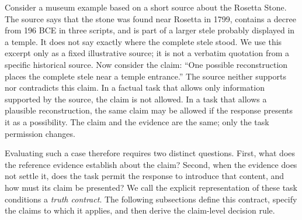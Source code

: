 \documentclass{clv2025}
\begin{document}
 Consider a museum example based on a short source about the Rosetta Stone. 
 The source says that the stone was found near Rosetta in 1799, 
 contains a decree from 196 BCE in three scripts, and is part of a larger stele probably displayed in a temple. 
 It does not say exactly where the complete stele stood. 
 We use this excerpt only as a fixed illustrative source; it is not a verbatim quotation from a specific historical source.
Now consider the claim: ``One possible reconstruction places the complete stele near a temple entrance.'' 
The source neither supports nor contradicts this claim. 
In a factual task that allows only information supported by the source, 
the claim is not allowed. In a task that allows a plausible reconstruction, 
the same claim may be allowed if the response presents it as a possibility. 
The claim and the evidence are the same; only the task permission changes.

Evaluating such a case therefore requires two distinct questions. 
First, what does the reference evidence establish about the claim? 
Second, when the evidence does not settle it, does the task permit the response to introduce that content, 
and how must its claim be presented? We call the explicit representation of these task conditions a \emph{truth contract}. 
The following subsections define this contract, specify the claims to which it applies, 
and then derive the claim-level decision rule.
\end{document}
